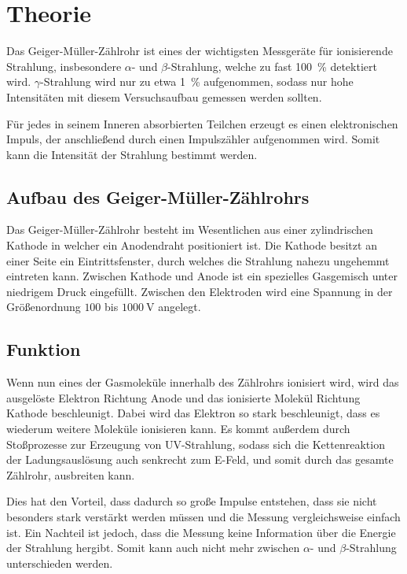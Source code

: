 \section{Theorie}
\label{sec:Theorie}
Das Geiger-Müller-Zählrohr ist eines der wichtigsten Messgeräte für ionisierende Strahlung,
insbesondere $\alpha$- und $\beta$-Strahlung, welche zu fast \SI{100}{\percent} detektiert wird.
$\gamma$-Strahlung wird nur zu etwa \SI{1}{\percent} aufgenommen,
sodass nur hohe Intensitäten mit diesem Versuchsaufbau gemessen werden sollten.

Für jedes in seinem Inneren absorbierten Teilchen erzeugt es einen elektronischen Impuls,
der anschließend durch einen Impulszähler aufgenommen wird.
Somit kann die Intensität der Strahlung bestimmt werden.

\subsection{Aufbau des Geiger-Müller-Zählrohrs}
Das Geiger-Müller-Zählrohr besteht im Wesentlichen aus einer zylindrischen Kathode in welcher ein Anodendraht positioniert ist.
Die Kathode besitzt an einer Seite ein Eintrittsfenster, durch welches die Strahlung nahezu ungehemmt eintreten kann.
Zwischen Kathode und Anode ist ein spezielles Gasgemisch unter niedrigem Druck eingefüllt.
Zwischen den Elektroden wird eine Spannung in der Größenordnung $\num{100}$ bis $\SI{1000}{\volt}$ angelegt.

\subsection{Funktion}
Wenn nun eines der Gasmoleküle innerhalb des Zählrohrs ionisiert wird, wird das ausgelöste Elektron Richtung Anode und das ionisierte Molekül
Richtung Kathode beschleunigt. Dabei wird das Elektron so stark beschleunigt, dass es wiederum weitere Moleküle ionisieren kann.
Es kommt außerdem durch Stoßprozesse zur Erzeugung von UV-Strahlung, sodass sich die Kettenreaktion der Ladungsauslösung
auch senkrecht zum E-Feld, und somit durch das gesamte Zählrohr, ausbreiten kann.

Dies hat den Vorteil, dass dadurch so große Impulse entstehen, dass sie nicht besonders stark verstärkt werden müssen und die
Messung vergleichsweise einfach ist. Ein Nachteil ist jedoch, dass die Messung keine Information
über die Energie der Strahlung hergibt. Somit kann auch nicht mehr zwischen $\alpha$- und $\beta$-Strahlung unterschieden werden.

